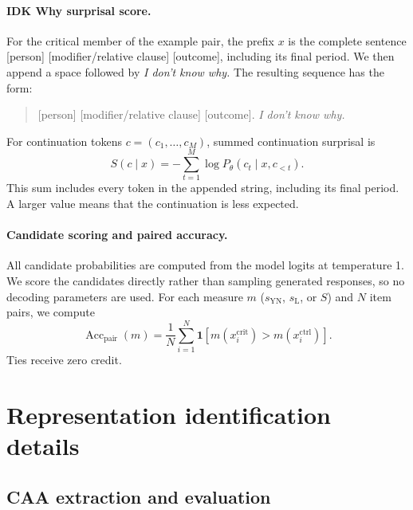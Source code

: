 \documentclass{article}
\begin{document}
\paragraph{IDK Why surprisal score.}
For the critical member of the example pair, the prefix $x$ is the complete sentence [person] [modifier/relative clause] [outcome], including its final period. We then append a space followed by \emph{I don't know why.} The resulting sequence has the form:
\begin{quote}\small
[person] [modifier/relative clause] [outcome].\emph{ I don't know why.}
\end{quote}
For continuation tokens $c=(c_1,\ldots,c_M)$, summed continuation surprisal is
\begin{equation}
S(c\mid x)=-\sum_{t=1}^{M}\log P_\theta(c_t\mid x,c_{<t}).
\label{eq:surprisal}
\end{equation}
This sum includes every token in the appended string, including its final period. A larger value means that the continuation is less expected.

\paragraph{Candidate scoring and paired accuracy.}
All candidate probabilities are computed from the model logits at temperature 1. We score the candidates directly rather than sampling generated responses, so no decoding parameters are used. For each measure $m$ ($s_{\mathrm{YN}}$, $s_{\mathrm{L}}$, or $S$) and $N$ item pairs, we compute
\begin{equation}
\operatorname{Acc}_{\mathrm{pair}}(m)
  =\frac{1}{N}\sum_{i=1}^{N}\mathbf{1}\!\left[
    m(x_i^{\mathrm{crit}})>m(x_i^{\mathrm{ctrl}})
  \right].
\label{eq:paired-accuracy}
\end{equation}
Ties receive zero credit.

\section{Representation identification details}
\label{app:representation-details}
\label{app:representation-examples}



\subsection{CAA extraction and evaluation}
\label{app:caa-details}
\end{document}
